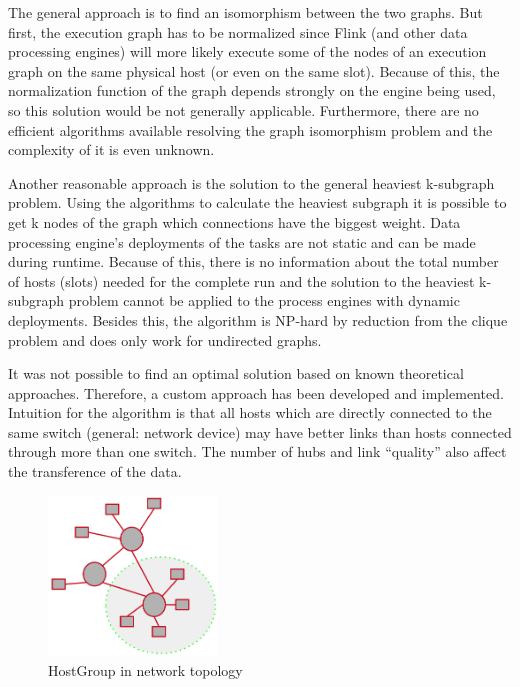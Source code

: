 The general approach is to find an isomorphism between the two graphs. But first, the execution
graph has to be normalized since Flink (and other data processing engines) will more likely execute
some of the nodes of an execution graph on the same physical host (or even on the same slot). Because
of this, the normalization function of the graph depends strongly on the engine being used, so this
solution would be not generally applicable. Furthermore, there are no efficient algorithms available
resolving the graph isomorphism problem and the complexity of it is even unknown.
\cite{graph}

Another reasonable approach is the solution to the general heaviest k-subgraph problem. Using the
algorithms to calculate the heaviest subgraph it is possible to get k nodes of the graph which
connections have the biggest weight. Data processing engine's deployments of the tasks are not
static and can be made during runtime. Because of this, there is no information about the total
number of hosts (slots) needed for the complete run and the solution to the heaviest k-subgraph
problem cannot be applied to the process engines with dynamic deployments. Besides this, the
algorithm is NP­-hard by reduction from the clique problem and does only work for undirected graphs.
\cite{ksubgraph}

It was not possible to find an optimal solution based on known theoretical approaches. Therefore, a
custom approach has been developed and implemented. Intuition for the algorithm is that
all hosts which are directly connected to the same switch (general: network device) may have better
links than hosts connected through more than one switch. The number of hubs and link “quality” also
affect the transference of the data.

\begin{figure}[h]
    \centering
    \includegraphics[width=0.4\textwidth]{graphics/hostgroup.png}
    \caption{HostGroup in network topology}
    \label{fig:hostgroup}
\end{figure}

